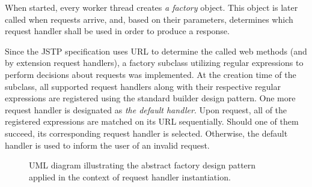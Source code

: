 When started, every worker thread creates \textit{a factory} object. This object is later called when requests arrive, and, based on their parameters, determines which request handler shall be used in order to produce a response.

Since the JSTP specification uses URL to determine the called web methods (and by extension request handlers), a factory subclass utilizing regular expressions to perform decisions about requests was implemented. At the creation time of the subclass, all supported request handlers along with their respective regular expressions are registered using the standard builder design pattern. One more request handler is designated as \textit{the default handler}. Upon request, all of the registered expressions are matched on its URL sequentially. Should one of them succeed, its corresponding request handler is selected. Otherwise, the default handler is used to inform the user of an invalid request.

\begin{figure}[t]
\begin{center}

\caption[UML diagram illustrating handler instantiation.]{UML diagram illustrating the abstract factory design pattern applied in the context of request handler instantiation.}
\label{fig:handler-factory}
\end{center}
\end{figure}

